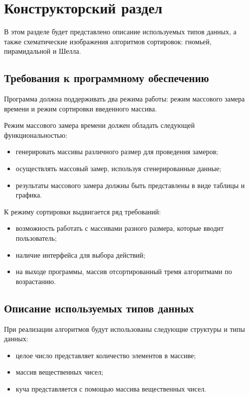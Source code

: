 \chapter{Конструкторский раздел}

В этом разделе будет представлено описание используемых типов данных, а также схематические изображения алгоритмов сортировок: гномьей, пирамидальной и Шелла.

\section{Требования к программному обеспечению}

Программа должна поддерживать два режима работы: режим массового замера времени и режим сортировки введенного массива.

Режим массового замера времени должен обладать следующей функциональностью:
\begin{itemize}
	\item генерировать массивы различного размер для проведения замеров;
	\item осуществлять массовый замер, используя сгенерированные данные;
	\item результаты массового замера должны быть представлены в виде таблицы и графика.
\end{itemize}

К режиму сортировки выдвигается ряд требований:
\begin{itemize}
	\item возможность работать с массивами разного размера, которые вводит пользователь;
	\item наличие интерфейса для выбора действий;
	\item на выходе программы, массив отсортированный тремя алгоритмами по возрастанию.
\end{itemize}

\section{Описание используемых типов данных}

При реализации алгоритмов будут использованы следующие структуры и типы данных:
\begin{itemize}
	\item целое число представляет количество элементов в массиве;
	\item массив вещественных чисел;
	\item куча представляется с помощью массива вещественных чисел.
\end{itemize}


